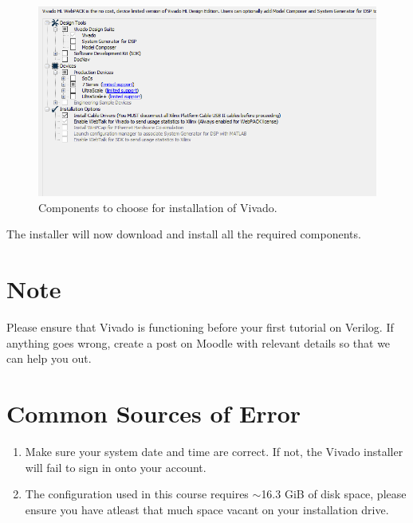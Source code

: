 \documentclass{article}
\begin{document}
\begin{figure}[h] \centering 
  \includegraphics[width=\linewidth]{./images/install_options.png}
  \caption{Components to choose for installation of Vivado.}
  \label{Fig:install_options}
\end{figure}
The installer will now download and install all the required
components.

\section*{Note}
Please ensure that Vivado is functioning before your first tutorial on
Verilog. If anything goes wrong, create a post on Moodle with relevant
details so that we can help you out.

\section*{Common Sources of Error}
\begin{enumerate}
\item Make sure your system date and time are correct. If not, the
  Vivado installer will fail to sign in onto your account.
\item The configuration used in this course requires {$\sim$}16.3 GiB of
  disk space, please ensure you have atleast that much space vacant on
  your installation drive.
\end{enumerate}
\end{document}
